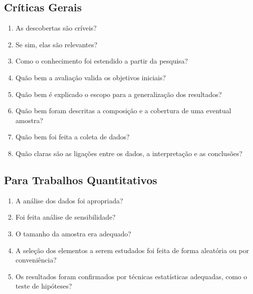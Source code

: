 \documentclass[a4paper,12pt]{article}
\begin{document}
\subsection*{Críticas Gerais}
\begin{enumerate}[label=\arabic*.]
    \item As descobertas são críveis? 
    \item Se sim, elas são relevantes? 
    \item Como o conhecimento foi estendido a partir da pesquisa? 
    \item Quão bem a avaliação valida os objetivos iniciais? 
    \item Quão bem é explicado o escopo para a generalização dos resultados? 
    \item Quão bem foram descritas a composição e a cobertura de uma eventual amostra? 
    \item Quão bem foi feita a coleta de dados? 
    \item Quão claras são as ligações entre os dados, a interpretação e as conclusões? 
    
\end{enumerate}

\subsection*{Para Trabalhos Quantitativos}
\begin{enumerate}[label=\arabic*.]
    \item A análise dos dados foi apropriada? 
    \item Foi feita análise de sensibilidade? 
    \item O tamanho da amostra era adequado? 
    \item A seleção dos elementos a serem estudados foi feita de forma aleatória ou por conveniência? 
    \item Os resultados foram confirmados por técnicas estatísticas adequadas, como o teste de hipóteses? 
\end{enumerate}
\end{document}
